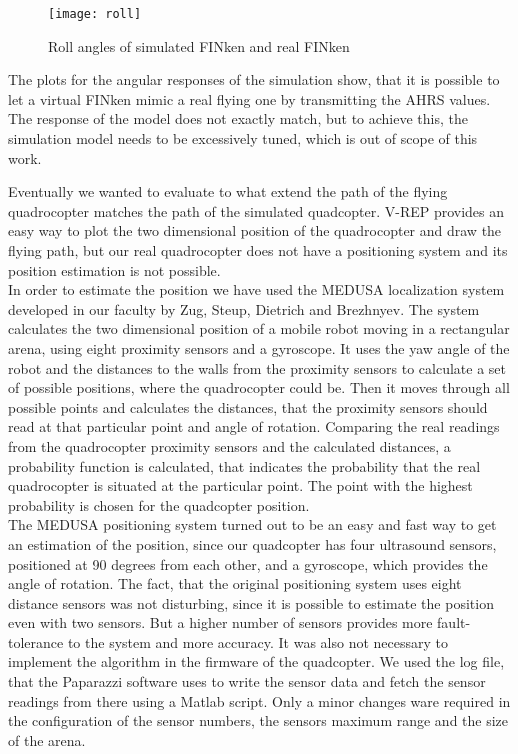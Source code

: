 \begin{figure}
	\begin{center}
	\texttt{[image: roll]}
	\caption{Roll angles of simulated FINken and real FINken}
	\label{pic:rollResponse}
	\end{center}
\end{figure}

The plots for the angular responses of the simulation show, that it is possible to let a virtual FINken mimic a real flying one by transmitting the \gls{AHRS} values. 
The response of the model does not exactly match, but to achieve this, the simulation model needs to be excessively tuned, which is out of scope of this work.



Eventually we wanted to evaluate to what extend the path of the flying quadrocopter matches the path of the simulated quadcopter. V-REP provides an easy way to plot the two dimensional position of the quadrocopter and draw the flying path, but our real quadrocopter does not have a positioning system and its position estimation is not possible.\\ 

In order to estimate the position we have used the MEDUSA localization system developed in our faculty by Zug, Steup, Dietrich and Brezhnyev\cite{Zug2011RobLoc}. 
The system calculates the two dimensional position of a mobile robot moving in a rectangular arena, using eight proximity sensors and a gyroscope. 
It uses the yaw angle of the robot and the distances to the walls from the proximity sensors to calculate a set of possible positions, where the quadrocopter could be. 
Then it moves through all possible points and calculates the distances, that the proximity sensors should read at that particular point and angle of rotation. 
Comparing the real readings from the quadrocopter proximity sensors and the calculated distances, a probability function is calculated, that indicates the probability that the real quadrocopter is situated at the particular point. 
The point with the highest probability is chosen for the quadcopter position.\\

The MEDUSA positioning system turned out to be an easy and fast way to get an estimation of the position, since our quadcopter has four ultrasound sensors, positioned at 90 degrees from each other, and a gyroscope, which provides the angle of rotation. 
The fact, that the original positioning system uses eight distance sensors was not disturbing, since it is possible to estimate the position even with two sensors. 
But a higher number of sensors provides more fault-tolerance to the system and more accuracy. 
It was also not necessary to implement the algorithm in the firmware of the quadcopter. 
We used the log file, that the Paparazzi software uses to write the sensor data and fetch the sensor readings from there using a Matlab script. 
Only a minor changes ware required in the configuration of the sensor numbers, the sensors maximum range and the size of the arena.\\

